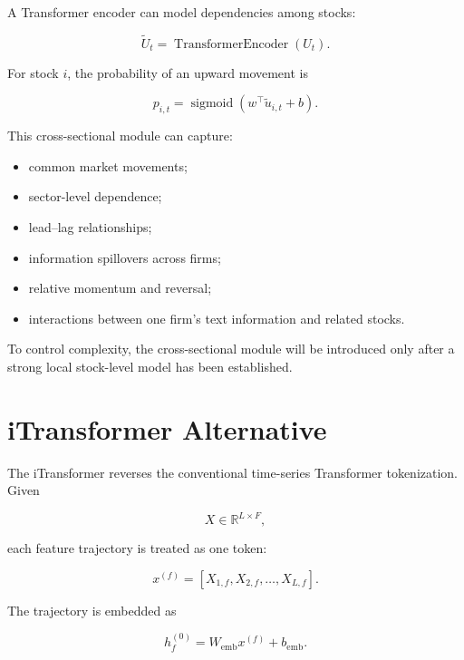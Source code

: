 \documentclass[11pt]{article}
\newcommand{\R}{\mathbb{R}}
\newcommand{\sigmoid}{\operatorname{sigmoid}}
\begin{document}
A Transformer encoder can model dependencies among stocks:

\begin{equation}
\widetilde U_t
=
\operatorname{TransformerEncoder}
\left(
U_t
\right).
\end{equation}

For stock $i$, the probability of an upward movement is

\begin{equation}
p_{i,t}
=
\sigmoid
\left(
w^\top
\widetilde u_{i,t}
+
b
\right).
\end{equation}

This cross-sectional module can capture:

\begin{itemize}
    \item common market movements;
    \item sector-level dependence;
    \item lead--lag relationships;
    \item information spillovers across firms;
    \item relative momentum and reversal;
    \item interactions between one firm's text information and related stocks.
\end{itemize}

To control complexity, the cross-sectional module will be introduced only after
a strong local stock-level model has been established.

\section{iTransformer Alternative}

The iTransformer reverses the conventional time-series Transformer
tokenization. Given

\begin{equation}
X
\in
\R^{L\times F},
\end{equation}

each feature trajectory is treated as one token:

\begin{equation}
x^{(f)}
=
\left[
X_{1,f},
X_{2,f},
\ldots,
X_{L,f}
\right].
\end{equation}

The trajectory is embedded as

\begin{equation}
h_f^{(0)}
=
W_{\mathrm{emb}}x^{(f)}
+
b_{\mathrm{emb}}.
\end{equation}
\end{document}
